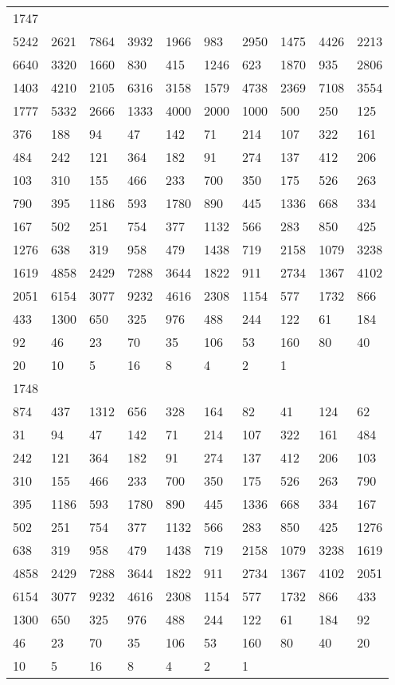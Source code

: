 \begin{longtable}{*{10}{l}}
1747&&&&&&&&&\\
5242& 2621& 7864& 3932& 1966& 983& 2950& 1475& 4426& 2213\\
6640& 3320& 1660& 830& 415& 1246& 623& 1870& 935& 2806\\
1403& 4210& 2105& 6316& 3158& 1579& 4738& 2369& 7108& 3554\\
1777& 5332& 2666& 1333& 4000& 2000& 1000& 500& 250& 125\\
376& 188& 94& 47& 142& 71& 214& 107& 322& 161\\
484& 242& 121& 364& 182& 91& 274& 137& 412& 206\\
103& 310& 155& 466& 233& 700& 350& 175& 526& 263\\
790& 395& 1186& 593& 1780& 890& 445& 1336& 668& 334\\
167& 502& 251& 754& 377& 1132& 566& 283& 850& 425\\
1276& 638& 319& 958& 479& 1438& 719& 2158& 1079& 3238\\
1619& 4858& 2429& 7288& 3644& 1822& 911& 2734& 1367& 4102\\
2051& 6154& 3077& 9232& 4616& 2308& 1154& 577& 1732& 866\\
433& 1300& 650& 325& 976& 488& 244& 122& 61& 184\\
92& 46& 23& 70& 35& 106& 53& 160& 80& 40\\
20& 10& 5& 16& 8& 4& 2& 1& \\

1748&&&&&&&&&\\
874& 437& 1312& 656& 328& 164& 82& 41& 124& 62\\
31& 94& 47& 142& 71& 214& 107& 322& 161& 484\\
242& 121& 364& 182& 91& 274& 137& 412& 206& 103\\
310& 155& 466& 233& 700& 350& 175& 526& 263& 790\\
395& 1186& 593& 1780& 890& 445& 1336& 668& 334& 167\\
502& 251& 754& 377& 1132& 566& 283& 850& 425& 1276\\
638& 319& 958& 479& 1438& 719& 2158& 1079& 3238& 1619\\
4858& 2429& 7288& 3644& 1822& 911& 2734& 1367& 4102& 2051\\
6154& 3077& 9232& 4616& 2308& 1154& 577& 1732& 866& 433\\
1300& 650& 325& 976& 488& 244& 122& 61& 184& 92\\
46& 23& 70& 35& 106& 53& 160& 80& 40& 20\\
10& 5& 16& 8& 4& 2& 1& \\


\end{longtable}
